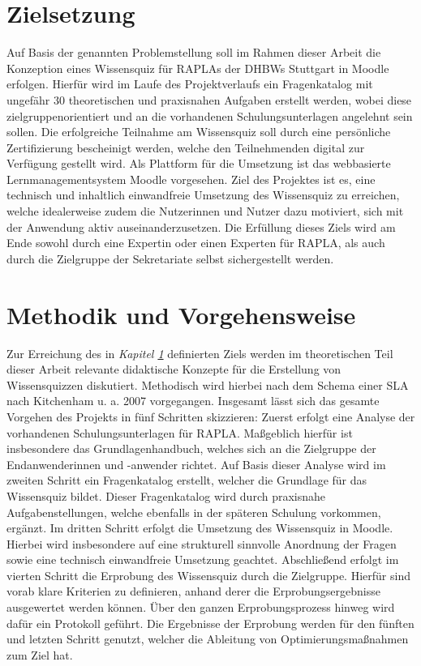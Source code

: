 \section{Zielsetzung}\label{sec:zielsetzung}
Auf Basis der genannten Problemstellung soll im Rahmen dieser Arbeit
die Konzeption eines Wissensquiz für \acp{RAPLA} der \acp{DHBW}
Stuttgart in Moodle erfolgen.
Hierfür wird im Laufe des Projektverlaufs ein Fragenkatalog mit ungefähr 30
theoretischen und praxisnahen Aufgaben erstellt werden, wobei diese zielgruppenorientiert
und an die vorhandenen Schulungsunterlagen angelehnt sein sollen.
Die erfolgreiche Teilnahme am Wissensquiz soll durch eine persönliche Zertifizierung
bescheinigt werden, welche den Teilnehmenden digital zur Verfügung gestellt wird.
Als Plattform für die Umsetzung ist das webbasierte Lernmanagementsystem Moodle
vorgesehen.
Ziel des Projektes ist es, eine technisch und inhaltlich einwandfreie Umsetzung
des Wissensquiz zu erreichen, welche idealerweise
zudem die Nutzerinnen und Nutzer dazu motiviert, sich mit der Anwendung aktiv
auseinanderzusetzen.
Die Erfüllung dieses Ziels wird am Ende sowohl durch eine Expertin oder einen
Experten für \ac{RAPLA}, als auch durch die Zielgruppe der Sekretariate selbst
sichergestellt werden.
\section{Methodik und Vorgehensweise}
Zur Erreichung des in \textit{Kapitel \ref{sec:zielsetzung}} definierten Ziels werden
im theoretischen Teil dieser Arbeit relevante didaktische Konzepte für die Erstellung von Wissensquizzen
diskutiert. Methodisch wird hierbei nach dem Schema einer \ac{SLA} nach Kitchenham u. a. 2007 vorgegangen.
Insgesamt lässt sich das gesamte Vorgehen des Projekts in fünf Schritten skizzieren:
Zuerst erfolgt eine Analyse der vorhandenen Schulungsunterlagen für \ac{RAPLA}.
Maßgeblich hierfür ist insbesondere das Grundlagenhandbuch, welches sich an die Zielgruppe der
Endanwenderinnen und -anwender richtet. Auf Basis dieser Analyse wird im zweiten Schritt
ein Fragenkatalog erstellt, welcher die Grundlage für das Wissensquiz bildet.
Dieser Fragenkatalog wird durch praxisnahe Aufgabenstellungen, welche ebenfalls
in der späteren Schulung vorkommen, ergänzt. Im dritten Schritt erfolgt die Umsetzung
des Wissensquiz in Moodle. Hierbei wird insbesondere auf eine strukturell
sinnvolle Anordnung der Fragen sowie eine technisch einwandfreie Umsetzung geachtet.
Abschließend erfolgt im vierten Schritt die Erprobung des Wissensquiz durch die Zielgruppe.
Hierfür sind vorab klare Kriterien zu definieren, anhand derer die Erprobungsergebnisse
ausgewertet werden können. Über den ganzen Erprobungsprozess hinweg wird dafür
ein Protokoll geführt. Die Ergebnisse der Erprobung werden für den fünften
und letzten Schritt genutzt, welcher die Ableitung von Optimierungsmaßnahmen
zum Ziel hat.
